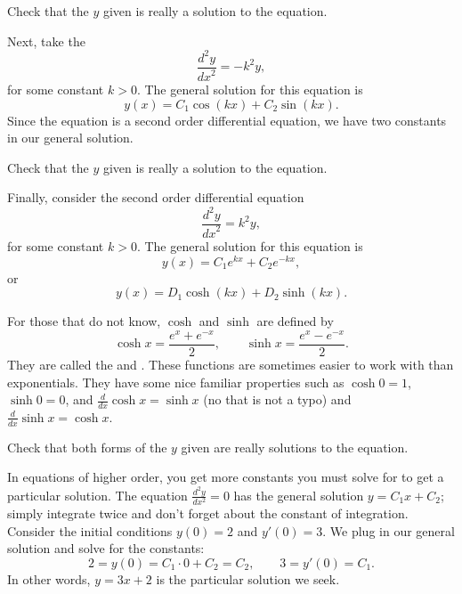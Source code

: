 \begin{exercise}
Check that the $y$ given is really a solution to the equation.
\end{exercise}

Next, take the
\emph{}
\begin{equation*}
\frac{d^2y}{{dx}^2} = -k^2 y ,
\end{equation*}
for some constant $k > 0$.
The general solution for this equation is
\begin{equation*}
y(x) = C_1 \cos(kx) + C_2 \sin(kx) .
\end{equation*}
Since the equation is a second order differential equation,
we have two constants in our general solution.

\begin{exercise}
Check that the $y$ given is really a solution to the equation.
\end{exercise}

Finally, consider the second order differential equation
\begin{equation*}
\frac{d^2y}{{dx}^2} = k^2 y ,
\end{equation*}
for some constant $k > 0$.
The general solution for this equation is
\begin{equation*}
y(x) = C_1 e^{kx} + C_2 e^{-kx} ,
\end{equation*}
or
\begin{equation*}
y(x) = D_1 \cosh(kx) + D_2 \sinh(kx) .
\end{equation*}

For those that do not know, $\cosh$ and $\sinh$ are defined by
\begin{equation*}
\cosh x = \frac{e^{x} + e^{-x}}{2} , \qquad
\sinh x = \frac{e^{x} - e^{-x}}{2} .
\end{equation*}
They are called the
\emph{}
and
\emph{}.
These functions are sometimes easier to
work with than exponentials.  They have some nice familiar
properties such as
$\cosh 0 = 1$, $\sinh 0 = 0$, and $\frac{d}{dx} \cosh x = \sinh x$ (no that is
not a typo)
and $\frac{d}{dx} \sinh x = \cosh x$.

\begin{exercise}
Check that both forms of the $y$ given are
really solutions to the equation.
\end{exercise}

\begin{example}
In equations of higher order, you get more constants you must solve for to
get a particular solution.  The equation $\frac{d^2y}{dx^2} = 0$ has the
general solution $y = C_1 x + C_2$; simply integrate twice and don't forget
about the constant of integration.  Consider the initial conditions $y(0) =
2$ and $y'(0) = 3$.  We plug in our general solution and solve for the
constants:
\begin{equation*}
2 = y(0) = C_1 \cdot 0 + C_2 = C_2, \qquad
3 = y'(0) = C_1 .
\end{equation*}
In other words, $y = 3x + 2$ is the particular solution we seek.
\end{example}

